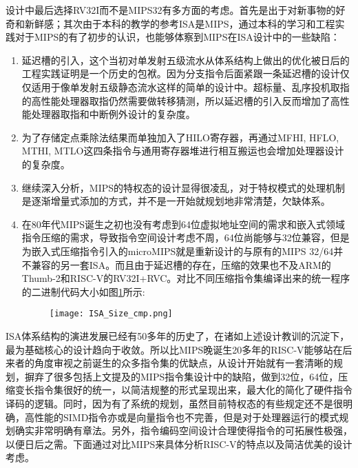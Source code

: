 设计中最后选择RV32I而不是MIPS32有多方面的考虑。首先是出于对新事物的好奇和新鲜感；其次由于本科的教学的参考ISA是MIPS，通过本科的学习和工程实践对于MIPS的有了初步的认识，也能够体察到MIPS在ISA设计中的一些缺陷：
\begin{enumerate}[label=(\alph*)]
	\item 延迟槽的引入，这个当初对单发射五级流水从体系结构上做出的优化被日后的工程实践证明是一个历史的包袱。因为分支指令后面紧跟一条延迟槽的设计仅仅适用于像单发射五级静态流水这样的简单的设计中。超标量、乱序投机取指的高性能处理器取指仍然需要做转移猜测，所以延迟槽的引入反而增加了高性能处理器取指和中断例外设计的复杂度。
	\item 为了存储定点乘除法结果而单独加入了HILO寄存器，再通过MFHI, HFLO, MTHI, MTLO这四条指令与通用寄存器堆进行相互搬运也会增加处理器设计的复杂度。
	\item 继续深入分析，MIPS的特权态的设计显得很凌乱，对于特权模式的处理机制是逐渐增量式添加的方式，并不是一开始就规划地非常清楚，欠缺体系。
	\item 在80年代MIPS诞生之初也没有考虑到64位虚拟地址空间的需求和嵌入式领域指令压缩的需求，导致指令空间设计考虑不周，64位尚能够与32位兼容，但是为嵌入式压缩指令引入的microMIPS就是重新设计的与原有的MIPS 32/64并不兼容的另一套ISA。而且由于延迟槽的存在，压缩的效果也不及ARM的Thumb-2和RISC-V的RV32I+RVC。对比不同压缩指令集编译出来的统一程序的二进制代码大小如图\ref{fig:sizecmp}所示:
	\begin{figure}[!htbp]
		\centering
		\texttt{[image: ISA\_Size\_cmp.png]}
		\label{fig:sizecmp}
	\end{figure}
\end{enumerate}

ISA体系结构的演进发展已经有50多年的历史了，在诸如上述设计教训的沉淀下，最为基础核心的设计趋向于收敛。所以比MIPS晚诞生20多年的RISC-V能够站在后来者的角度审视之前诞生的众多指令集的优缺点，从设计开始就有一套清晰的规划，摒弃了很多包括上文提及的MIPS指令集设计中的缺陷，做到32位，64位，压缩变长指令集很好的统一，以简洁规整的形式呈现出来，最大化的简化了硬件指令译码的逻辑。同时，因为有了系统的规划，虽然目前特权态的有些规定还不是很明确，高性能的SIMD指令亦或是向量指令也不完善，但是对于处理器运行的模式规划确实非常明确有章法。另外，指令编码空间设计合理使得指令的可拓展性极强，以便日后之需。下面通过对比MIPS来具体分析RISC-V的特点以及简洁优美的设计考虑。

